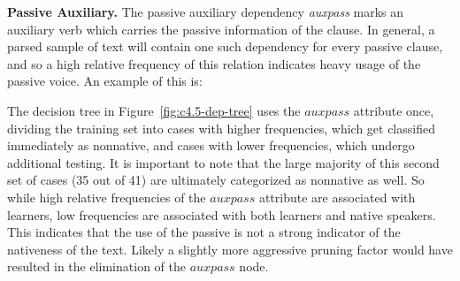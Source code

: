 \documentclass[main.tex]{subfiles}
\begin{document}
\textbf{Passive Auxiliary.} The passive auxiliary dependency \textit{auxpass} marks an auxiliary verb which carries the passive information of the clause. In general, a parsed sample of text will contain one such dependency for every passive clause, and so a high relative frequency of this relation indicates heavy usage of the passive voice. An example 
\citep{typed-deps-manual} of this is:

The decision tree in Figure~\ref{fig:c4.5-dep-tree} uses the $auxpass$ attribute once, dividing the training set into cases with higher frequencies, which get classified immediately as nonnative, and cases with lower frequencies, which undergo additional testing. It is important to note that the large majority of this second set of cases (35 out of 41) are ultimately categorized as nonnative as well. So while high relative frequencies of the $auxpass$ attribute are associated with learners, low frequencies are associated with both learners and native speakers. This indicates that the use of the passive is not a strong indicator of the nativeness of the text. Likely a slightly more aggressive pruning factor would have resulted in the elimination of the $auxpass$ node.

\end{document}
